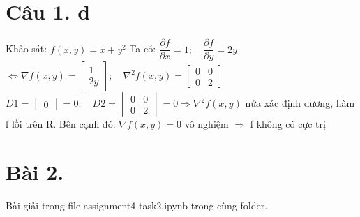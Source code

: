 \documentclass[11pt]{article}
\begin{document}
\section*{Câu 1. d}
Khảo sát: $ f(x, y) = x + y^2 $
\newline Ta có: $ \dfrac{\partial f}{\partial x} = 1; \quad \dfrac{\partial f}{\partial y} = 2y $
\newline $ \Leftrightarrow \nabla f(x, y) = \begin{bmatrix}
    1 \\
    2y \end{bmatrix}; \quad \nabla^2 f(x, y) = \begin{bmatrix}
    0 & 0 \\
    0 & 2
\end{bmatrix} $
\newline $ D1 = \begin{vmatrix}
    0
\end{vmatrix} = 0; \quad D2 = \begin{vmatrix}
    0 & 0 \\
    0 & 2
\end{vmatrix} = 0 \Rightarrow \nabla^2 f(x, y) $ nửa xác định dương, hàm f lồi trên R.
\newline Bên cạnh đó: $ \nabla f(x, y) = 0 $ vô nghiệm $ \Rightarrow $ f không có cực trị

\section*{Bài 2.}
Bài giải trong file assignment4-task2.ipynb trong cùng folder.
\end{document}

